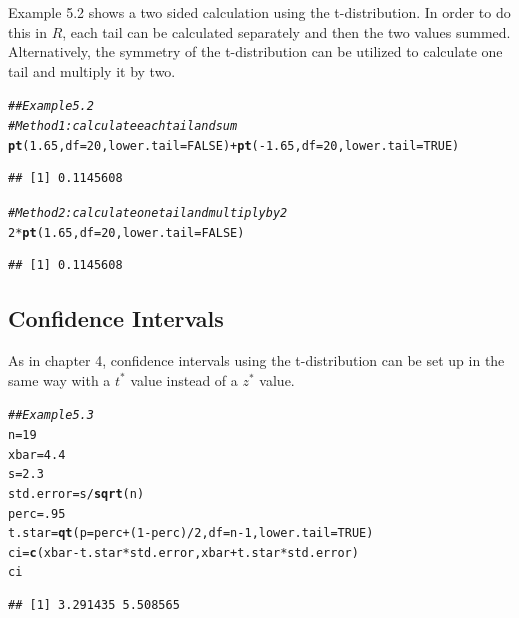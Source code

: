 \documentclass{report}\usepackage[]{graphicx}\usepackage[]{color}
\makeatletter
\newcommand{\hlnum}[1]{\textcolor[rgb]{0.686,0.059,0.569}{#1}}%
\newcommand{\hlcom}[1]{\textcolor[rgb]{0.678,0.584,0.686}{\textit{#1}}}%
\newcommand{\hlopt}[1]{\textcolor[rgb]{0,0,0}{#1}}%
\newcommand{\hlstd}[1]{\textcolor[rgb]{0.345,0.345,0.345}{#1}}%
\newcommand{\hlkwb}[1]{\textcolor[rgb]{0.69,0.353,0.396}{#1}}%
\newcommand{\hlkwc}[1]{\textcolor[rgb]{0.333,0.667,0.333}{#1}}%
\newcommand{\hlkwd}[1]{\textcolor[rgb]{0.737,0.353,0.396}{\textbf{#1}}}%
\newenvironment{kframe}{%
 \def\at@end@of@kframe{}%
 \ifinner\ifhmode%
  \def\at@end@of@kframe{\end{minipage}}%
  \begin{minipage}{\columnwidth}%
 \fi\fi%
 \def\FrameCommand##1{\hskip\@totalleftmargin \hskip-\fboxsep
 \colorbox{shadecolor}{##1}\hskip-\fboxsep
     \hskip-\linewidth \hskip-\@totalleftmargin \hskip\columnwidth}%
 \MakeFramed {\advance\hsize-\width
   \@totalleftmargin\z@ \linewidth\hsize
   \@setminipage}}%
 {\par\unskip\endMakeFramed%
 \at@end@of@kframe}
\newenvironment{knitrout}{}{} %
\makeatother
\begin{document}
Example 5.2 shows a two sided calculation using the t-distribution.  In order to do this in $R$, each tail can be calculated separately and then the two values summed.  Alternatively, the symmetry of the t-distribution can be utilized to calculate one tail and multiply it by two.  
\begin{knitrout}
\color{fgcolor}\begin{kframe}
\begin{alltt}
\hlcom{## Example 5.2 }
\hlcom{# Method 1: calculate each tail and sum }
\hlkwd{pt}\hlstd{(}\hlnum{1.65}\hlstd{,} \hlkwc{df} \hlstd{=} \hlnum{20}\hlstd{,} \hlkwc{lower.tail} \hlstd{=} \hlnum{FALSE}\hlstd{)} \hlopt{+} \hlkwd{pt}\hlstd{(}\hlopt{-}\hlnum{1.65}\hlstd{,} \hlkwc{df} \hlstd{=} \hlnum{20}\hlstd{,} \hlkwc{lower.tail} \hlstd{=} \hlnum{TRUE}\hlstd{)}
\end{alltt}
\begin{verbatim}
## [1] 0.1145608
\end{verbatim}
\begin{alltt}
\hlcom{# Method 2: calculate one tail and multiply by 2 }
\hlnum{2}\hlopt{*}\hlkwd{pt}\hlstd{(}\hlnum{1.65}\hlstd{,} \hlkwc{df} \hlstd{=} \hlnum{20}\hlstd{,} \hlkwc{lower.tail} \hlstd{=} \hlnum{FALSE}\hlstd{)}
\end{alltt}
\begin{verbatim}
## [1] 0.1145608
\end{verbatim}
\end{kframe}
\end{knitrout}


\subsection{Confidence Intervals}
As in chapter 4, confidence intervals using the t-distribution can be set up in the same way with a $t^*$ value instead of a $z^*$ value.  

\begin{knitrout}
\color{fgcolor}\begin{kframe}
\begin{alltt}
\hlcom{## Example 5.3 }
\hlstd{n} \hlkwb{=} \hlnum{19}
\hlstd{xbar} \hlkwb{=} \hlnum{4.4}
\hlstd{s} \hlkwb{=} \hlnum{2.3}
\hlstd{std.error} \hlkwb{=} \hlstd{s}\hlopt{/}\hlkwd{sqrt}\hlstd{(n)}
\hlstd{perc} \hlkwb{=} \hlnum{.95}
\hlstd{t.star} \hlkwb{=} \hlkwd{qt}\hlstd{(}\hlkwc{p} \hlstd{= perc} \hlopt{+} \hlstd{(}\hlnum{1}\hlopt{-}\hlstd{perc)}\hlopt{/}\hlnum{2}\hlstd{,} \hlkwc{df} \hlstd{= n}\hlopt{-}\hlnum{1}\hlstd{,} \hlkwc{lower.tail} \hlstd{=} \hlnum{TRUE}\hlstd{)}
\hlstd{ci} \hlkwb{=} \hlkwd{c}\hlstd{(xbar} \hlopt{-} \hlstd{t.star}\hlopt{*}\hlstd{std.error, xbar} \hlopt{+} \hlstd{t.star}\hlopt{*}\hlstd{std.error)}
\hlstd{ci}
\end{alltt}
\begin{verbatim}
## [1] 3.291435 5.508565
\end{verbatim}
\end{kframe}
\end{knitrout}
\end{document}
